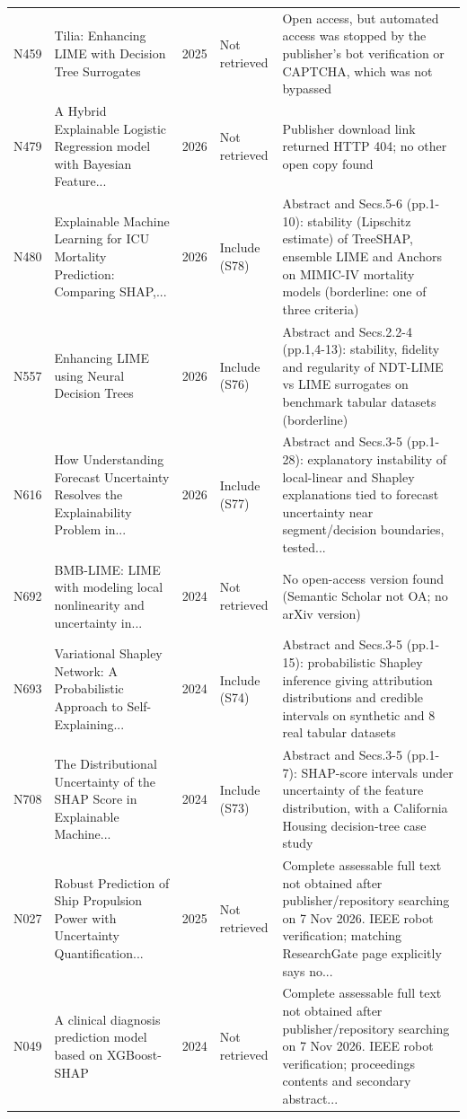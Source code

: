 \begin{longtable}{@{}P{1.0cm}P{6.3cm}P{0.7cm}P{1.6cm}P{6.1cm}@{}}
N459 & Tilia: Enhancing LIME with Decision Tree Surrogates & 2025 & Not retrieved & Open access, but automated access was stopped by the publisher's bot verification or CAPTCHA, which was not bypassed \\
N479 & A Hybrid Explainable Logistic Regression model with Bayesian Feature... & 2026 & Not retrieved & Publisher download link returned HTTP 404; no other open copy found \\
N480 & Explainable Machine Learning for ICU Mortality Prediction: Comparing SHAP,... & 2026 & Include (S78) & Abstract and Secs.5-6 (pp.1-10): stability (Lipschitz estimate) of TreeSHAP, ensemble LIME and Anchors on MIMIC-IV mortality models (borderline: one of three criteria) \\
N557 & Enhancing LIME using Neural Decision Trees & 2026 & Include (S76) & Abstract and Secs.2.2-4 (pp.1,4-13): stability, fidelity and regularity of NDT-LIME vs LIME surrogates on benchmark tabular datasets (borderline) \\
N616 & How Understanding Forecast Uncertainty Resolves the Explainability Problem in... & 2026 & Include (S77) & Abstract and Secs.3-5 (pp.1-28): explanatory instability of local-linear and Shapley explanations tied to forecast uncertainty near segment/\allowbreak{}decision boundaries, tested... \\
N692 & BMB-LIME: LIME with modeling local nonlinearity and uncertainty in... & 2024 & Not retrieved & No open-access version found (Semantic Scholar not OA; no arXiv version) \\
N693 & Variational Shapley Network: A Probabilistic Approach to Self-Explaining... & 2024 & Include (S74) & Abstract and Secs.3-5 (pp.1-15): probabilistic Shapley inference giving attribution distributions and credible intervals on synthetic and 8 real tabular datasets \\
N708 & The Distributional Uncertainty of the SHAP Score in Explainable Machine... & 2024 & Include (S73) & Abstract and Secs.3-5 (pp.1-7): SHAP-score intervals under uncertainty of the feature distribution, with a California Housing decision-tree case study \\
N027 & Robust Prediction of Ship Propulsion Power with Uncertainty Quantification... & 2025 & Not retrieved & Complete assessable full text not obtained after publisher/\allowbreak{}repository searching on 7 Nov 2026. IEEE robot verification; matching ResearchGate page explicitly says no... \\
N049 & A clinical diagnosis prediction model based on XGBoost-SHAP & 2024 & Not retrieved & Complete assessable full text not obtained after publisher/\allowbreak{}repository searching on 7 Nov 2026. IEEE robot verification; proceedings contents and secondary abstract... \\

\end{longtable}

